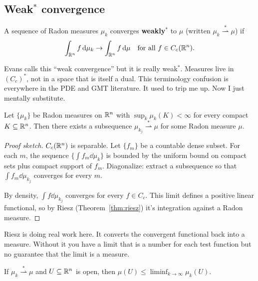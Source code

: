 \subsection{Weak$^*$ convergence}\label{subsec:weak-star}

\begin{definition}\label{def:weak-star}
A sequence of Radon measures $\mu_k$ converges \textbf{weakly$^*$} to
$\mu$ (written $\mu_k \stackrel{*}{\rightharpoonup} \mu$) if
\[
  \int_{\mathbb{R}^n} f \,\mathrm{d}\mu_k \to \int_{\mathbb{R}^n} f \,\mathrm{d}\mu
  \quad \text{for all } f \in C_c(\mathbb{R}^n).
\]
\end{definition}

Evans calls this ``weak convergence'' but it is really weak$^*$.
Measures live in $(C_c)^*$, not in a space that is itself a dual. This
terminology confusion is everywhere in the PDE and GMT literature. It used to trip me up. Now I just mentally substitute.

\begin{theorem}\label{thm:weak-compactness}
Let $\{\mu_k\}$ be Radon measures on $\mathbb{R}^n$ with
$\sup_k \mu_k(K) < \infty$ for every compact $K \subseteq \mathbb{R}^n$. Then
there exists a subsequence
$\mu_{k_j} \stackrel{*}{\rightharpoonup} \mu$ for some Radon measure
$\mu$.
\end{theorem}

\begin{proof}[Proof sketch]
$C_c(\mathbb{R}^n)$ is separable. Let $\{f_m\}$ be a countable dense subset. For
each $m$, the sequence $\{\int f_m \dd\mu_k\}$ is bounded by the uniform
bound on compact sets plus compact support of $f_m$. Diagonalize: extract
a subsequence so that $\int f_m \dd\mu_{k_j}$ converges for every $m$.

By density, $\int f \dd\mu_{k_j}$ converges for every
$f \in C_c$. This limit defines a positive linear functional, so by Riesz
(Theorem~\ref{thm:riesz}) it's integration against a Radon measure.
\qedhere
\end{proof}

Riesz is doing real work here. It converts the convergent functional
back into a measure. Without it you have a limit that is a number for each test function but no guarantee that the limit is a measure.

\begin{proposition}\label{prop:lsc-weak}
If $\mu_k \stackrel{*}{\rightharpoonup} \mu$ and
$U \subseteq \mathbb{R}^n$ is open, then
$\mu(U) \le \liminf_{k \to \infty} \mu_k(U)$.
\end{proposition}

